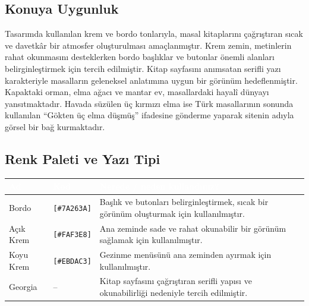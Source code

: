 \documentclass[12pt,a4paper]{article}
\begin{document}
\subsection{Konuya Uygunluk}
Tasarımda kullanılan krem ve bordo tonlarıyla, masal kitaplarını çağrıştıran sıcak ve davetkâr bir atmosfer oluşturulması amaçlanmıştır. Krem zemin, metinlerin rahat okunmasını desteklerken bordo başlıklar ve butonlar önemli alanları belirginleştirmek için tercih edilmiştir. Kitap sayfasını anımsatan serifli yazı karakteriyle masalların geleneksel anlatımına uygun bir görünüm hedeflenmiştir. Kapaktaki orman, elma ağacı ve mantar ev, masallardaki hayalî dünyayı yansıtmaktadır. Havada süzülen üç kırmızı elma ise Türk masallarının sonunda kullanılan “Gökten üç elma düşmüş” ifadesine gönderme yaparak sitenin adıyla görsel bir bağ kurmaktadır.

\subsection{Renk Paleti ve Yazı Tipi}
\begin{center}
\begin{tabular}{@{}llp{6.4cm}@{}}
\toprule
\rowcolor{ana}\textcolor{white}{\textbf{Ad}} & \textcolor{white}{\textbf{Kod}} & \textcolor{white}{\textbf{Nerede / neden kullandınız?}} \\
\midrule
\relax Bordo & \texttt{[\#7A263A]} & Başlık ve butonları belirginleştirmek, sıcak bir görünüm oluşturmak için kullanılmıştır. \\
\relax Açık Krem & \texttt{[\#FAF3E8]} & Ana zeminde sade ve rahat okunabilir bir görünüm sağlamak için kullanılmıştır. \\
\relax Koyu Krem & \texttt{[\#EBDAC3]} & Gezinme menüsünü ana zeminden ayırmak için kullanılmıştır. \\
\relax Georgia & -- & Kitap sayfasını çağrıştıran serifli yapısı ve okunabilirliği nedeniyle tercih edilmiştir. \\
\bottomrule
\end{tabular}
\end{center}
\end{document}

